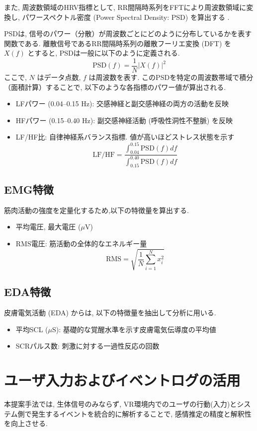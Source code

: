 \documentclass[book,paper=a4,fontsize=10pt,jafontscale=0.92]{jlreq}
\begin{document}
また, 周波数領域のHRV指標として, RR間隔時系列をFFTにより周波数領域に変換し, パワースペクトル密度 (Power Spectral Density: PSD) を算出する \cite{TaskForce1996}.

PSDは, 信号のパワー（分散）が周波数ごとにどのように分布しているかを表す関数である. 離散信号であるRR間隔時系列の離散フーリエ変換 (DFT) を $X(f)$ とすると, PSDは一般に以下のように定義される.
$$ \mathrm{PSD}(f) = \frac{1}{N} |X(f)|^2 $$
ここで, $N$ はデータ点数, $f$ は周波数を表す. このPSDを特定の周波数帯域で積分（面積計算）することで, 以下のような各指標のパワー値が算出される.

\begin{itemize}
\item {LFパワー} (0.04--0.15 Hz): 交感神経と副交感神経の両方の活動を反映
\item {HFパワー} (0.15--0.40 Hz): 副交感神経活動 (呼吸性洞性不整脈) を反映
\item {LF/HF比}: 自律神経系バランス指標. 値が高いほどストレス状態を示す
$$\mathrm{LF/HF} = \frac{\int_{0.04}^{0.15} \mathrm{PSD}(f) df}{\int_{0.15}^{0.40} \mathrm{PSD}(f) df}$$
\end{itemize}

\subsection{EMG特徴}
筋肉活動の強度を定量化するため,以下の特徴量を算出する.
\begin{itemize}
\item {平均電圧, 最大電圧} ($\mu$V)
\item {RMS電圧}: 筋活動の全体的なエネルギー量
$$\mathrm{RMS} = \sqrt{\frac{1}{N} \sum_{i=1}^{N} x_i^2}$$
\end{itemize}

\subsection{EDA特徴}
皮膚電気活動 (EDA) からは, 以下の特徴量を抽出して分析に用いる.
\begin{itemize}
\item {平均SCL} ($\mu$S): 基礎的な覚醒水準を示す皮膚電気伝導度の平均値
\item {SCRパルス数}: 刺激に対する一過性反応の回数 \cite{Hinkle2019}
\end{itemize}

\section{ユーザ入力およびイベントログの活用}
本提案手法では, 生体信号のみならず, VR環境内でのユーザの行動(入力)とシステム側で発生するイベントを統合的に解析することで, 感情推定の精度と解釈性を向上させる.
\end{document}
